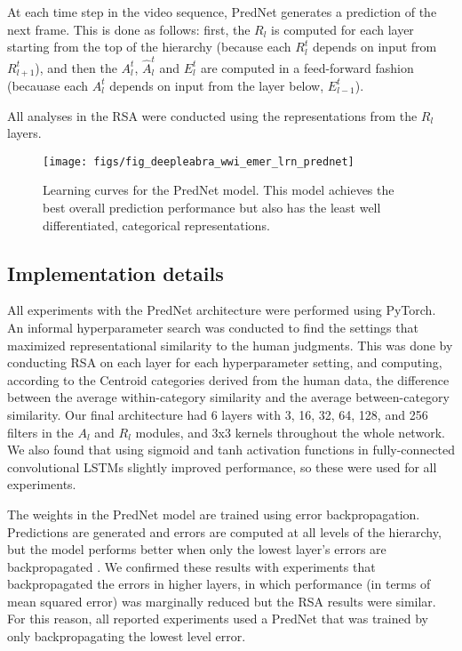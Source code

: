 At each time step in the video sequence, PredNet generates a prediction of the next frame. This is done as follows: first, the $R_l$ is computed for each layer starting from the top of the hierarchy (because each $R_l^t$ depends on input from $R_{l+1}^t$), and then the $A_l^t$, $\hat{A}_l^{t}$ and $E_l^t$ are computed in a feed-forward fashion (becauase each $A_l^t$ depends on input from the layer below, $E_{l-1}^t$). 


All analyses in the RSA were conducted using the representations from the $R_l$ layers. 

\begin{figure}
  \centering\texttt{[image: figs/fig\_deepleabra\_wwi\_emer\_lrn\_prednet]}
  \caption{\footnotesize Learning curves for the PredNet model.  This model achieves the best overall prediction performance but also has the least well differentiated, categorical representations.}
  \label{fig.prednet_lrn}
\end{figure}

\subsection{Implementation details}

All experiments with the PredNet architecture were performed using PyTorch. An informal hyperparameter search was conducted to find the settings that maximized representational similarity to the human judgments. This was done by conducting RSA on each layer for each hyperparameter setting, and computing, according to the Centroid categories derived from the human data, the difference between the average within-category similarity and the average between-category similarity. Our final architecture had 6 layers with 3, 16, 32, 64, 128, and 256 filters in the $A_l$ and $R_l$ modules, and 3x3 kernels throughout the whole network. We also found that using sigmoid and tanh activation functions in fully-connected convolutional LSTMs slightly improved performance, so these were used for all experiments.

The weights in the PredNet model are trained using error backpropagation. Predictions are generated and errors are computed at all levels of the hierarchy, but the model performs better when only the lowest layer's errors are backpropagated \citep{LotterKreimanCox16}. We confirmed these results with experiments that backpropagated the errors in higher layers, in which performance (in terms of mean squared error) was marginally reduced but the RSA results were similar. For this reason, all reported experiments used a PredNet that was trained by only backpropagating the lowest level error.

